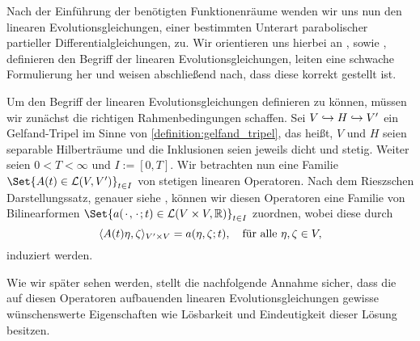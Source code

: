 \documentclass[../main.tex]{subfiles}
\begin{document}
Nach der Einführung der benötigten Funktionenräume wenden wir uns nun den linearen Evolutionsgleichungen, einer bestimmten Unterart parabolischer partieller Differentialgleichungen, zu.
Wir orientieren uns hierbei an \textcite{Lions:1971wp}, \textcite{Schwab:2009ec} sowie \textcite{Urban:2014kg},
definieren den Begriff der linearen Evolutionsgleichungen, leiten eine schwache Formulierung her und weisen abschließend nach, dass diese korrekt gestellt ist.

Um den Begriff der linearen Evolutionsgleichungen definieren zu können, müssen wir zunächst die richtigen Rahmenbedingungen schaffen.
Sei $V \denseinclusion H \denseinclusion V'$ ein Gelfand-Tripel im Sinne von \cref{definition:gelfand_tripel}, das heißt, $V$ und $H$ seien separable Hilberträume und die Inklusionen seien jeweils dicht und stetig.
Weiter seien $0 < T < \infty$ und $I := [0, T]$.
Wir betrachten nun eine Familie $\Set{A(t) \in \mathcal L(V, V')}_{t \in I}$ von stetigen linearen Operatoren.
Nach dem Rieszschen Darstellungssatz, genauer siehe \cite[Theorem \S{}22.1]{Halmos:1957vd}, können wir diesen Operatoren eine Familie von Bilinearformen $\Set{a(\blank, \blank; t) \in \mathcal L(V \times V, \mathbb{R})}_{t \in I}$ zuordnen, wobei diese durch
\begin{equation}
    \skp{A(t)\eta}{\zeta}{V' \times V} = a(\eta, \zeta; t), \quad \fa \eta, \zeta \in V,
\end{equation}
induziert werden.

Wie wir später sehen werden, stellt die nachfolgende Annahme sicher, dass die auf diesen Operatoren aufbauenden linearen Evolutionsgleichungen gewisse wünschenswerte Eigenschaften wie Lösbarkeit und Eindeutigkeit dieser Lösung besitzen.
\end{document}
